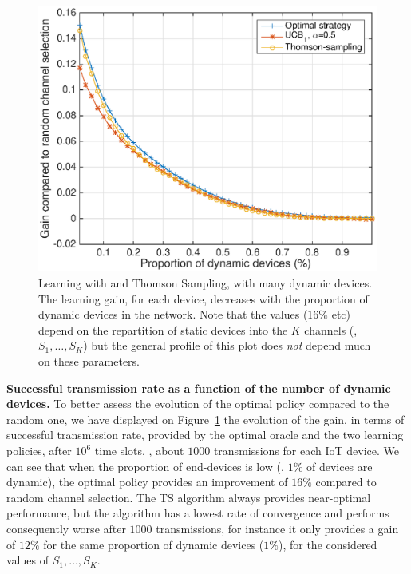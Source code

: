 \begin{figure}[!h]
    \centering
    \includegraphics[scale=0.65]{perf_learning.eps}
    \caption{Learning with \UCB{} and Thomson Sampling, with many dynamic devices.
        The learning gain, for each device, decreases with the proportion of dynamic devices in the network.
        Note that the values ($16\%$ etc) depend on the repartition of static devices into the $K$ channels (\ie, $S_1,\dots,S_K$) but the general profile of this plot does \emph{not} depend much on these parameters.
    }
    \label{fig:41:perf_learning}
\end{figure}


\textbf{Successful transmission rate as a function of the number of dynamic devices.}
%
To better assess the evolution of the optimal policy compared to the random one, we have displayed on Figure~\ref{fig:41:perf_learning} the evolution of the gain, in terms of successful transmission rate, provided by the optimal oracle and the two learning policies, after $10^6$ time slots, \ie, about $1000$ transmissions for each IoT device.
We can see that when the proportion of end-devices is low (\eg, $1\%$ of devices are dynamic), the optimal policy provides an improvement of $16\%$ compared to random channel selection.
The TS algorithm always provides near-optimal performance, but the \UCB{} algorithm has a lowest rate of convergence and performs consequently worse after $1000$ transmissions, for instance it only provides a gain of $12\%$ for the same proportion of dynamic devices ($1\%$),
for the considered values of $S_1,\dots,S_K$.

